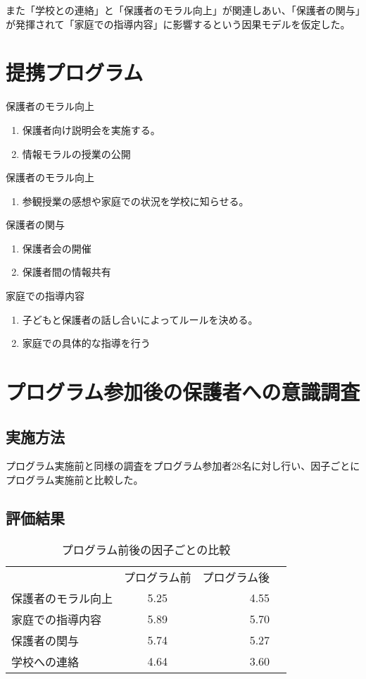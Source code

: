 \documentclass[a4j,11pt]{jsarticle}
\begin{document}
また「学校との連絡」と「保護者のモラル向上」が関連しあい、「保護者の関与」が発揮されて「家庭での指導内容」に影響するという因果モデルを仮定した。




\section{提携プログラム}
保護者のモラル向上
\begin{enumerate}
\item 保護者向け説明会を実施する。
\item 情報モラルの授業の公開
  \end{enumerate}

保護者のモラル向上
\begin{enumerate}
\item 参観授業の感想や家庭での状況を学校に知らせる。
  \end{enumerate}
  
 保護者の関与
\begin{enumerate}
\item 保護者会の開催
\item 保護者間の情報共有
  \end{enumerate}
  
家庭での指導内容
\begin{enumerate}
\item 子どもと保護者の話し合いによってルールを決める。
\item 家庭での具体的な指導を行う
  \end{enumerate}



\section{プログラム参加後の保護者への意識調査}
\subsection{実施方法}
\label{sec:kih}
プログラム実施前と同様の調査をプログラム参加者28名に対し行い、因子ごとにプログラム実施前と比較した。

\subsection{評価結果}
\begin{table}[htb]
  \centering
  \caption{プログラム前後の因子ごとの比較}
\begin{tabular}{lcrr}
 & プログラム前 & プログラム後 \\ %
保護者のモラル向上 & 5.25 & 4.55 \\
家庭での指導内容 & 5.89 & 5.70\\
保護者の関与 & 5.74 & 5.27 \\
学校への連絡 & 4.64 & 3.60
  \end{tabular}
\end{table}
\end{document}
